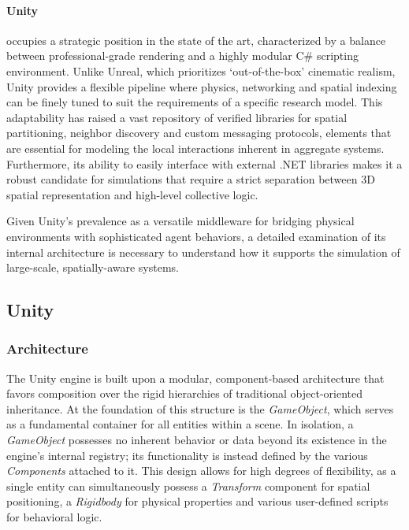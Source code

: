 \paragraph{Unity} occupies a strategic position in the state of the art, characterized by a balance between professional-grade rendering and a highly modular C\# scripting environment. Unlike Unreal, which prioritizes `out-of-the-box' cinematic realism, Unity provides a flexible pipeline where physics, networking and spatial indexing can be finely tuned to suit the requirements of a specific research model. This adaptability has raised a vast repository of verified libraries for spatial partitioning, neighbor discovery and custom messaging protocols, elements that are essential for modeling the local interactions inherent in aggregate systems. Furthermore, its ability to easily interface with external .NET libraries makes it a robust candidate for simulations that require a strict separation between 3D spatial representation and high-level collective logic.

Given Unity's prevalence as a versatile middleware for bridging physical environments with sophisticated agent behaviors, a detailed examination of its internal architecture is necessary to understand how it supports the simulation of large-scale, spatially-aware systems.

\subsection{Unity}

\subsubsection{Architecture}
The Unity engine is built upon a modular, component-based architecture that favors composition over the rigid hierarchies of traditional object-oriented inheritance. At the foundation of this structure is the \emph{GameObject}, which serves as a fundamental container for all entities within a scene. In isolation, a \emph{GameObject} possesses no inherent behavior or data beyond its existence in the engine's internal registry; its functionality is instead defined by the various \emph{Components} attached to it. This design allows for high degrees of flexibility, as a single entity can simultaneously possess a \emph{Transform} component for spatial positioning, a \textit{Rigidbody} for physical properties and various user-defined scripts for behavioral logic.

